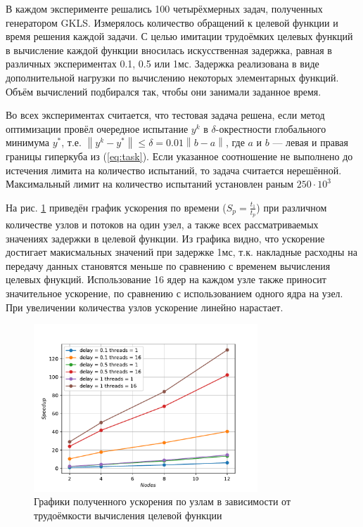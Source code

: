 \documentclass[a4paper]{article}
\begin{document}
В каждом эксперименте решались 100 четырёхмерных задач, полученных генератором GKLS.
Измерялось количество обращений к целевой функции и время решения каждой задачи.
С целью имитации трудоёмких целевых функций в вычисление каждой функции вносилась искусственная задержка,
равная в различных экспериментах 0.1, 0.5 или 1мс. Задержка реализована в виде дополнительной
нагрузки по вычислению некоторых элементарных функций. Объём вычислений подбирался так, чтобы они занимали заданное время.

Во всех экспериментах считается, что тестовая задача решена, если метод оптимизации провёл очередное испытание \(y^k\) в
\(\delta\)-окрестности глобального минимума \(y^*\), т.е. $\left\|y^k-
y^*\right\|\leqslant \delta = 0.01\left\|b-a\right\|$, где \(a\) и \(b\) --- левая и правая границы гиперкуба из (\ref{eq:task}).
Если указанное соотношение не выполнено до истечения лимита на количество испытаний, то задача считается нерешённой.
Максимальный лимит на количество испытаний установлен раным $250\cdot 10^3$

На рис. \ref{fig:speedup_nodes} приведён график ускорения по времени ($S_p=\frac{t_1}{t_p}$)
при различном количестве узлов и потоков на один узел, а также всех рассматриваемых значениях задержки в
целевой функции. Из графика видно, что ускорение достигает макисмальных значений при задержке 1мс, т.к.
накладные расходны на передачу данных становятся меньше по сравнению с временем вычисления целевых фнукций.
Использование 16 ядер на каждом узле также приносит значительное ускорение, по сравнению с использованием одного
ядра на узел. При увеличении количества узлов ускорение линейно нарастает.

\begin{figure}[H]
  \center
  \includegraphics[width=0.75\textwidth]{gpu_mpi/gklsh4d/speedup_nodes.pdf}
  \caption{Графики полученного ускорения по узлам в зависимости от трудоёмкости вычисления целевой функции}
  \label{fig:speedup_nodes}
\end{figure}
\end{document}
